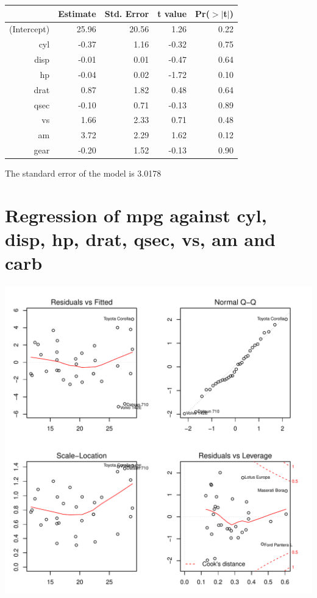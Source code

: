 \documentclass{article}\usepackage[]{graphicx}\usepackage[]{color}
\makeatletter
\def\maxwidth{ %
  \ifdim\Gin@nat@width>\linewidth
    \linewidth
  \else
    \Gin@nat@width
  \fi
}
\newenvironment{knitrout}{}{} %
\makeatother
\begin{document}
\begin{table}[ht]
\centering
\begin{tabular}{rrrrr}
  \hline
 & Estimate & Std. Error & t value & Pr($>$$|$t$|$) \\ 
  \hline
(Intercept) & 25.96 & 20.56 & 1.26 & 0.22 \\ 
  cyl & -0.37 & 1.16 & -0.32 & 0.75 \\ 
  disp & -0.01 & 0.01 & -0.47 & 0.64 \\ 
  hp & -0.04 & 0.02 & -1.72 & 0.10 \\ 
  drat & 0.87 & 1.82 & 0.48 & 0.64 \\ 
  qsec & -0.10 & 0.71 & -0.13 & 0.89 \\ 
  vs & 1.66 & 2.33 & 0.71 & 0.48 \\ 
  am & 3.72 & 2.29 & 1.62 & 0.12 \\ 
  gear & -0.20 & 1.52 & -0.13 & 0.90 \\ 
   \hline
\end{tabular}
\end{table}




The standard error of the model is 3.0178

\newpage

\section{Regression of mpg against cyl, disp, hp, drat, qsec, vs, am and carb }
\begin{knitrout}
\color{fgcolor}

{\centering \includegraphics[width=\maxwidth]{figure/lm-cyl-disp-hp-drat-qsec-vs-am-carb} 

}



\end{knitrout}
\end{document}
